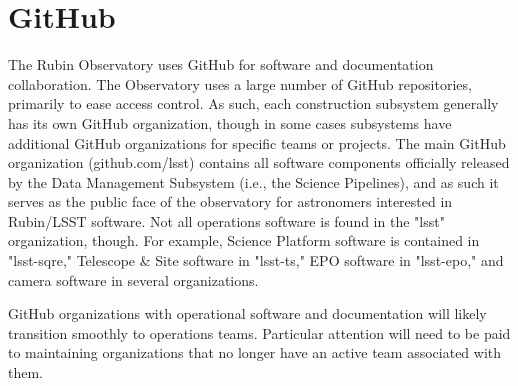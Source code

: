 \newpage
\section{GitHub}

The Rubin Observatory uses GitHub for software and documentation collaboration. The Observatory uses a large number of GitHub repositories, primarily to ease access control. As such, each construction subsystem generally has its own GitHub organization, though in some cases subsystems have additional GitHub organizations for specific teams or projects. The main GitHub organization (github.com/lsst) contains all software components officially released by the Data Management Subsystem (i.e., the Science Pipelines), and as such it serves as the public face of the observatory for astronomers interested in Rubin/LSST software. Not all operations software is found in the "lsst" organization, though. For example, Science Platform software is contained in "lsst-sqre," Telescope \& Site software in "lsst-ts," EPO software in "lsst-epo," and camera software in several organizations.

GitHub organizations with operational software and documentation will likely transition smoothly to operations teams. Particular attention will need to be paid to maintaining organizations that no longer have an active team associated with them.

